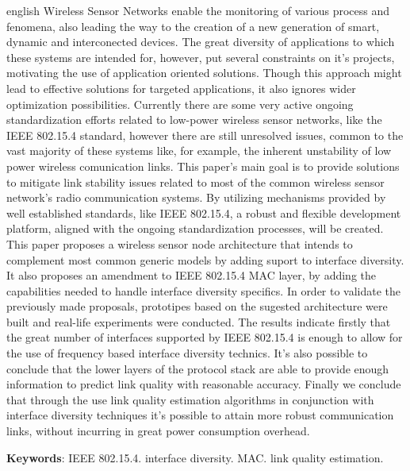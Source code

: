 \documentclass[
	12pt,				%
	openright,			%
	oneside,
	a4paper,			%
	english,			%
	french,				%
	spanish,			%
	brazil				%
	]{abntex2}
\begin{document}
\begin{resumo}[Abstract]
 \begin{otherlanguage*}{english}
   Wireless Sensor Networks enable the monitoring of various process and fenomena, also leading the way to the creation of a new generation of smart, dynamic and interconected devices. The great diversity of applications to which these systems are intended for, however, put several constraints on it's projects, motivating the use of application oriented solutions. Though this approach might lead to effective solutions for targeted applications, it also ignores wider optimization possibilities. Currently there are some very active  ongoing standardization efforts related to low-power wireless sensor networks, like the IEEE 802.15.4 standard, however there are still unresolved issues, common to the vast majority of these systems like, for example, the inherent unstability of low power wireless comunication links. This paper's main goal is to provide solutions to mitigate link stability  issues related to most of the common wireless sensor network's radio communication systems. By utilizing mechanisms provided by well established standards, like IEEE 802.15.4, a robust and flexible development platform, aligned with the ongoing standardization processes, will be created. This paper proposes a wireless sensor node architecture that intends to complement most common generic models by adding suport to interface diversity. It also proposes an amendment to IEEE 802.15.4 MAC layer, by adding the capabilities needed to handle interface diversity specifics. In order to validate the previously made proposals, prototipes based on the sugested architecture were built and real-life experiments were conducted. The results indicate firstly that the great number of interfaces supported by IEEE 802.15.4 is enough to allow for the use of frequency based interface diversity technics. It's also possible to conclude that the lower layers of the protocol stack are able to provide enough information to predict link quality with reasonable accuracy. Finally we conclude that through the use link quality estimation algorithms  in conjunction with interface diversity techniques it's possible to attain more robust communication links, without incurring in great power consumption overhead.

   \vspace{\onelineskip}
 
   \noindent 
   \textbf{Keywords}: IEEE 802.15.4. interface diversity. MAC. link quality estimation.
 \end{otherlanguage*}
\end{resumo}
\end{document}
